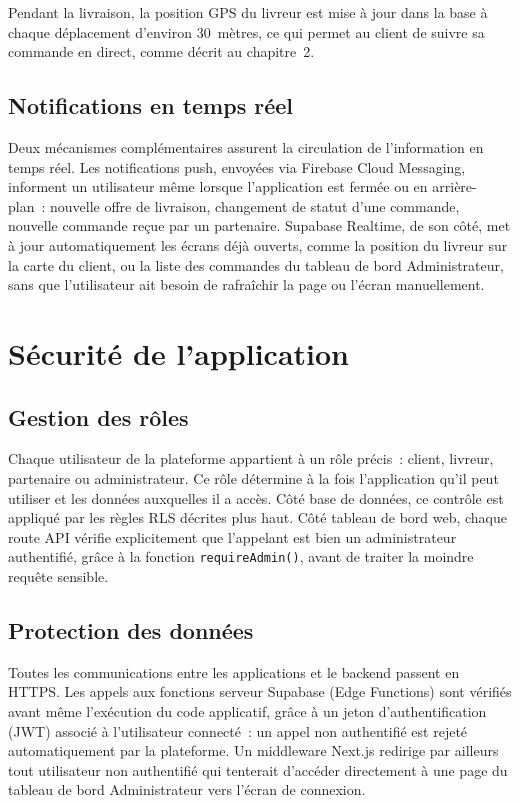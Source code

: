 \documentclass[12pt,fleqn,a4paper]{report}
\begin{document}
\begin{justify}
Pendant la livraison, la position GPS du livreur est mise à jour dans la base à chaque déplacement d'environ 30~mètres, ce qui permet au client de suivre sa commande en direct, comme décrit au chapitre~2.

\subsection{Notifications en temps réel}

Deux mécanismes complémentaires assurent la circulation de l'information en temps réel. Les notifications push, envoyées via Firebase Cloud Messaging, informent un utilisateur même lorsque l'application est fermée ou en arrière-plan~: nouvelle offre de livraison, changement de statut d'une commande, nouvelle commande reçue par un partenaire. Supabase Realtime, de son côté, met à jour automatiquement les écrans déjà ouverts, comme la position du livreur sur la carte du client, ou la liste des commandes du tableau de bord Administrateur, sans que l'utilisateur ait besoin de rafraîchir la page ou l'écran manuellement.

\section{Sécurité de l'application}

\subsection{Gestion des rôles}

Chaque utilisateur de la plateforme appartient à un rôle précis~: client, livreur, partenaire ou administrateur. Ce rôle détermine à la fois l'application qu'il peut utiliser et les données auxquelles il a accès. Côté base de données, ce contrôle est appliqué par les règles RLS décrites plus haut. Côté tableau de bord web, chaque route API vérifie explicitement que l'appelant est bien un administrateur authentifié, grâce à la fonction \texttt{requireAdmin()}, avant de traiter la moindre requête sensible.

\subsection{Protection des données}

Toutes les communications entre les applications et le backend passent en HTTPS. Les appels aux fonctions serveur Supabase (Edge Functions) sont vérifiés avant même l'exécution du code applicatif, grâce à un jeton d'authentification (JWT) associé à l'utilisateur connecté~: un appel non authentifié est rejeté automatiquement par la plateforme. Un middleware Next.js redirige par ailleurs tout utilisateur non authentifié qui tenterait d'accéder directement à une page du tableau de bord Administrateur vers l'écran de connexion.


\end{justify}
\end{document}
